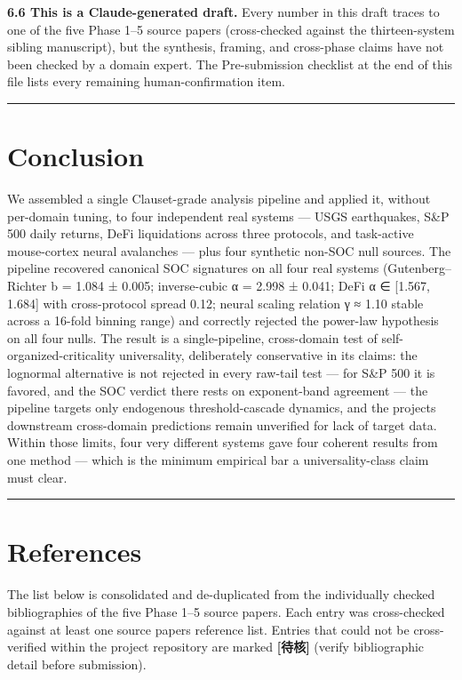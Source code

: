\documentclass[
  11pt]{article}
\begin{document}
\textbf{6.6 This is a Claude-generated draft.} Every number in this
draft traces to one of the five Phase 1--5 source papers (cross-checked
against the thirteen-system sibling manuscript), but the synthesis,
framing, and cross-phase claims have not been checked by a domain
expert. The Pre-submission checklist at the end of this file lists every
remaining human-confirmation item.

\begin{center}\rule{0.5\linewidth}{0.5pt}\end{center}

\section{Conclusion}\label{sec:7}

We assembled a single Clauset-grade analysis pipeline and applied it,
without per-domain tuning, to four independent real systems --- USGS
earthquakes, S\&P 500 daily returns, DeFi liquidations across three
protocols, and task-active mouse-cortex neural avalanches --- plus four
synthetic non-SOC null sources. The pipeline recovered canonical SOC
signatures on all four real systems (Gutenberg--Richter b = 1.084 ±
0.005; inverse-cubic α = 2.998 ± 0.041; DeFi α ∈ {[}1.567, 1.684{]} with
cross-protocol spread 0.12; neural scaling relation γ ≈ 1.10 stable
across a 16-fold binning range) and correctly rejected the power-law
hypothesis on all four nulls. The result is a single-pipeline,
cross-domain test of self-organized-criticality universality,
deliberately conservative in its claims: the lognormal alternative is
not rejected in every raw-tail test --- for S\&P 500 it is favored, and
the SOC verdict there rests on exponent-band agreement --- the pipeline
targets only endogenous threshold-cascade dynamics, and the
project\textquotesingle s downstream cross-domain predictions remain
unverified for lack of target data. Within those limits, four very
different systems gave four coherent results from one method --- which
is the minimum empirical bar a universality-class claim must clear.

\begin{center}\rule{0.5\linewidth}{0.5pt}\end{center}

\section*{References}\label{references}

The list below is consolidated and de-duplicated from the individually
checked bibliographies of the five Phase 1--5 source papers. Each entry
was cross-checked against at least one source paper\textquotesingle s
reference list. Entries that could not be cross-verified within the
project repository are marked \textbf{{[}待核{]}} (verify bibliographic
detail before submission).
\end{document}
